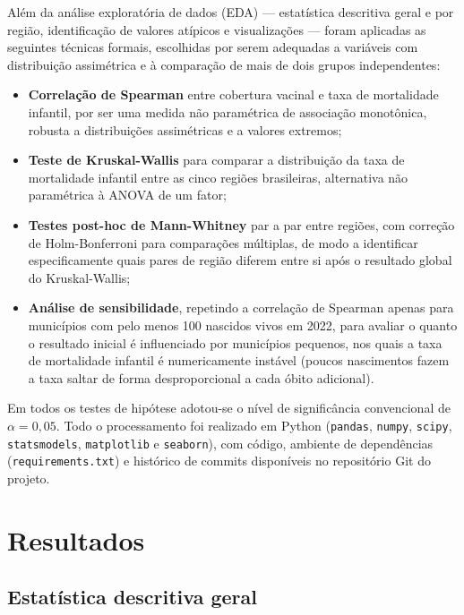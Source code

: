 \documentclass[pdflatex,sn-mathphys-num]{sn-jnl}
\begin{document}
Além da análise exploratória de dados (EDA) — estatística descritiva geral e por região, identificação de valores atípicos e visualizações — foram aplicadas as seguintes técnicas formais, escolhidas por serem adequadas a variáveis com distribuição assimétrica e à comparação de mais de dois grupos independentes:

\begin{itemize}
\item \textbf{Correlação de Spearman} entre cobertura vacinal e taxa de mortalidade infantil, por ser uma medida não paramétrica de associação monotônica, robusta a distribuições assimétricas e a valores extremos;
\item \textbf{Teste de Kruskal-Wallis} para comparar a distribuição da taxa de mortalidade infantil entre as cinco regiões brasileiras, alternativa não paramétrica à ANOVA de um fator;
\item \textbf{Testes post-hoc de Mann-Whitney} par a par entre regiões, com correção de Holm-Bonferroni para comparações múltiplas, de modo a identificar especificamente quais pares de região diferem entre si após o resultado global do Kruskal-Wallis;
\item \textbf{Análise de sensibilidade}, repetindo a correlação de Spearman apenas para municípios com pelo menos 100 nascidos vivos em 2022, para avaliar o quanto o resultado inicial é influenciado por municípios pequenos, nos quais a taxa de mortalidade infantil é numericamente instável (poucos nascimentos fazem a taxa saltar de forma desproporcional a cada óbito adicional).
\end{itemize}

Em todos os testes de hipótese adotou-se o nível de significância convencional de $\alpha = 0{,}05$. Todo o processamento foi realizado em Python (\texttt{pandas}, \texttt{numpy}, \texttt{scipy}, \texttt{statsmodels}, \texttt{matplotlib} e \texttt{seaborn}), com código, ambiente de dependências (\texttt{requirements.txt}) e histórico de commits disponíveis no repositório Git do projeto.

\section{Resultados}\label{sec:resultados}

\subsection{Estatística descritiva geral}
\end{document}
